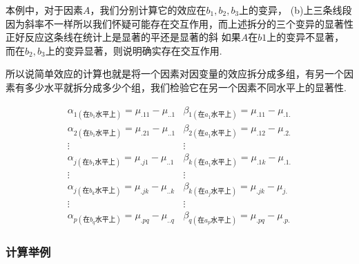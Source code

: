 本例中，对于因素$A$，我们分别计算它的效应在$b_1,b_2,b_3$上的变异，
(b)上三条线段因为斜率不一样所以我们怀疑可能存在交互作用，而上述拆分的三个变异的显著性正好反应这条线在统计上是显著的平还是显著的斜
如果$A$在$b1$上的变异不显著，而在$b_2,b_3$上的变异显著，则说明确实存在交互作用.

所以说简单效应的计算也就是将一个因素对因变量的效应拆分成多组，有另一个因素有多少水平就拆分成多少个组，我们检验它在另一个因素不同水平上的显著性.

\[\begin{array}{cc}
    \alpha _{1\left( \text{在}b_1\text{水平上} \right)} = \mu _{.11} - \mu _{..1} & \beta _{1\left( \text{在}a_1\text{水平上} \right)} = \mu _{.11} - \mu _{.1.}\\
    \alpha _{2\left( \text{在}b_1\text{水平上} \right)} = \mu _{.21} - \mu _{..1}& \beta _{2\left( \text{在}a_1\text{水平上} \right)} = \mu _{.12} - \mu _{.2.}\\
    \vdots                                              & \vdots\\
    \alpha _{j\left( \text{在}b_1\text{水平上} \right)} = \mu _{.j1} - \mu _{..1}&\beta _{k\left( \text{在}a_1\text{水平上} \right)}= \mu _{.1k} - \mu _{.1.}\\
    \vdots                                              & \vdots\\
    \alpha _{j\left( \text{在}b_k\text{水平上} \right)} = \mu _{.jk} - \mu _{..k}& \beta _{k\left( \text{在}a_j\text{水平上} \right)}= \mu _{.jk} - \mu _{j.}\\
    \vdots                                              & \vdots\\
    \alpha _{p\left( \text{在}b_q\text{水平上} \right)} = \mu _{.pq} - \mu _{..q}& \beta _{q\left( \text{在}a_p\text{水平上} \right)}= \mu _{.pq} - \mu _{.p.}
\end{array}\]




\subsubsection{计算举例}

